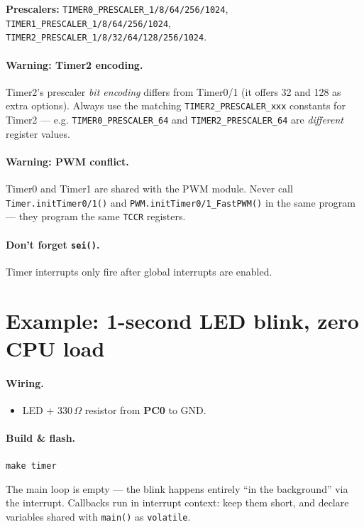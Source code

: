 \documentclass[11pt,a4paper]{article}
\begin{document}
\textbf{Prescalers:} \texttt{TIMER0\_PRESCALER\_1/8/64/256/1024},
\texttt{TIMER1\_PRESCALER\_1/8/64/256/1024},
\texttt{TIMER2\_PRESCALER\_1/8/32/64/128/256/1024}.

\paragraph{Warning: Timer2 encoding.} Timer2's prescaler \emph{bit encoding}
differs from Timer0/1 (it offers 32 and 128 as extra options). Always use the
matching \texttt{TIMER2\_PRESCALER\_xxx} constants for Timer2 --- e.g.
\texttt{TIMER0\_PRESCALER\_64} and \texttt{TIMER2\_PRESCALER\_64} are
\emph{different} register values.

\paragraph{Warning: PWM conflict.} Timer0 and Timer1 are shared with the PWM
module. Never call \texttt{Timer.initTimer0/1()} and
\texttt{PWM.initTimer0/1\_FastPWM()} in the same program --- they program the
same \texttt{TCCR} registers.

\paragraph{Don't forget \texttt{sei()}.} Timer interrupts only fire after
global interrupts are enabled.

\section{Example: 1-second LED blink, zero CPU load}

\paragraph{Wiring.}
\begin{itemize}
  \item LED + 330\,$\Omega$ resistor from \textbf{PC0} to GND.
\end{itemize}

\paragraph{Build \& flash.} \texttt{make timer}



The main loop is empty --- the blink happens entirely ``in the background''
via the interrupt. Callbacks run in interrupt context: keep them short, and
declare variables shared with \texttt{main()} as \texttt{volatile}.
\end{document}
